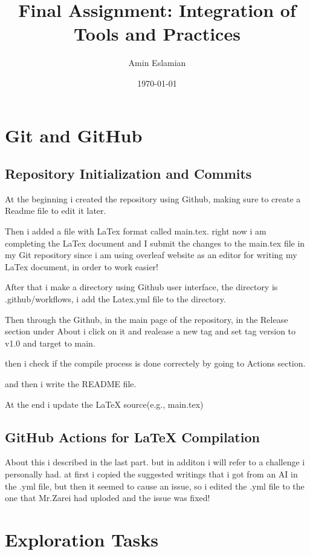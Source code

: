 \documentclass{article}
\title{Final Assignment: Integration of Tools and Practices}
\author{Amin Eslamian}
\date{\today}
\begin{document}
\maketitle
\newpage
\tableofcontents
\newpage


\section{Git and GitHub}
\subsection{Repository Initialization and Commits}
At the  beginning i created the repository using Github, making sure to create a Readme file to edit it later.


Then i added a file with LaTex format called main.tex.
right now i am completing the LaTex document and I submit the changes to the main.tex file in my Git repository since i am using overleaf website as an editor for writing my LaTex document, in order to work easier!

After that i make a directory using Github user interface, the directory is .github/workflows, i add the Latex.yml file to the directory.


Then through the Github, in the main page of the repository, in the Release section under About i click on it and realease a new tag and set tag version to v1.0 and target to main.


then i check if the compile process is done correctely by going to Actions section.


and then i write the README file.


At the end i update the LaTeX source(e.g., main.tex)

\subsection{GitHub Actions for LaTeX Compilation}
About this i described in the last part. but in additon i will refer to a challenge i personally had. at first i copied the suggested writings that i got from an AI in the .yml file, but then it seemed to cause an issue, so i edited the .yml file to the one that Mr.Zarei had uploded and the issue was fixed!

\section{Exploration Tasks}
\end{document}
